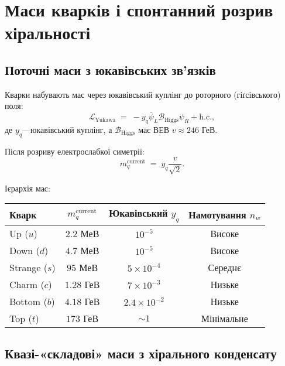 \documentclass[11pt,a4paper]{article}
\newcommand{\Biv}{\mathcal{B}}
\newcommand{\Lag}{\mathcal{L}}
\theoremstyle{definition}
\theoremstyle{plain}
\theoremstyle{remark}
\begin{document}
\vspace{1em}

\section{Маси кварків і спонтанний розрив хіральності}
\label{sec:quark-masses}

\subsection{Поточні маси з юкавівських зв’язків}

Кварки набувають мас через юкавівський куплінг до роторного (гіґсівського) поля:
\begin{equation}
\Lag_{\mathrm{Yukawa}} \;=\; -y_q \bar{\psi}_L \Biv_{\mathrm{Higgs}} \psi_R + \text{h.c.},
\label{eq:quark-yukawa}
\end{equation}
де $y_q$—юкавівський куплінг, а $\Biv_{\mathrm{Higgs}}$ має ВЕВ $v\approx 246$ ГеВ.

Після розриву електрослабкої симетрії:
\begin{equation}
m_q^{\mathrm{current}} \;=\; y_q \frac{v}{\sqrt{2}}.
\label{eq:current-mass}
\end{equation}

Ієрархія мас:
\begin{center}
\begin{tabular}{lccc}
\toprule
Кварк & $m_q^{\mathrm{current}}$ & Юкавівський $y_q$ & Намотування $n_w$ \\
\midrule
Up ($u$)     & $2{.}2$ МеВ   & $10^{-5}$ & Високе \\
Down ($d$)   & $4{.}7$ МеВ   & $10^{-5}$ & Високе \\
Strange ($s$)& $95$ МеВ      & $5\times 10^{-4}$ & Середнє \\
Charm ($c$)  & $1{.}28$ ГеВ  & $7\times 10^{-3}$ & Низьке \\
Bottom ($b$) & $4{.}18$ ГеВ  & $2{.}4\times 10^{-2}$ & Низьке \\
Top ($t$)    & $173$ ГеВ     & $\sim 1$ & Мінімальне \\
\bottomrule
\end{tabular}
\end{center}

\subsection{Квазі-«складові» маси з хірального конденсату}
\end{document}
